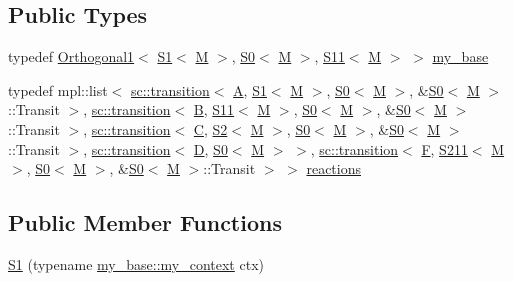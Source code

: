 \subsection*{Public Types}
\begin{DoxyCompactItemize}
\item 
typedef \mbox{\hyperlink{struct_orthogonal1}{Orthogonal1}}$<$ \mbox{\hyperlink{struct_s1}{S1}}$<$ \mbox{\hyperlink{struct_m}{M}} $>$, \mbox{\hyperlink{struct_s0}{S0}}$<$ \mbox{\hyperlink{struct_m}{M}} $>$, \mbox{\hyperlink{struct_s11}{S11}}$<$ \mbox{\hyperlink{struct_m}{M}} $>$ $>$ \mbox{\hyperlink{struct_s1_a61df79a9bb93c0317d33b9602244cdf7}{my\+\_\+base}}
\item 
typedef mpl\+::list$<$ \mbox{\hyperlink{classboost_1_1statechart_1_1transition}{sc\+::transition}}$<$ \mbox{\hyperlink{struct_a}{A}}, \mbox{\hyperlink{struct_s1}{S1}}$<$ \mbox{\hyperlink{struct_m}{M}} $>$, \mbox{\hyperlink{struct_s0}{S0}}$<$ \mbox{\hyperlink{struct_m}{M}} $>$, \&\mbox{\hyperlink{struct_s0}{S0}}$<$ \mbox{\hyperlink{struct_m}{M}} $>$\+::Transit $>$, \mbox{\hyperlink{classboost_1_1statechart_1_1transition}{sc\+::transition}}$<$ \mbox{\hyperlink{struct_b}{B}}, \mbox{\hyperlink{struct_s11}{S11}}$<$ \mbox{\hyperlink{struct_m}{M}} $>$, \mbox{\hyperlink{struct_s0}{S0}}$<$ \mbox{\hyperlink{struct_m}{M}} $>$, \&\mbox{\hyperlink{struct_s0}{S0}}$<$ \mbox{\hyperlink{struct_m}{M}} $>$\+::Transit $>$, \mbox{\hyperlink{classboost_1_1statechart_1_1transition}{sc\+::transition}}$<$ \mbox{\hyperlink{struct_c}{C}}, \mbox{\hyperlink{struct_s2}{S2}}$<$ \mbox{\hyperlink{struct_m}{M}} $>$, \mbox{\hyperlink{struct_s0}{S0}}$<$ \mbox{\hyperlink{struct_m}{M}} $>$, \&\mbox{\hyperlink{struct_s0}{S0}}$<$ \mbox{\hyperlink{struct_m}{M}} $>$\+::Transit $>$, \mbox{\hyperlink{classboost_1_1statechart_1_1transition}{sc\+::transition}}$<$ \mbox{\hyperlink{struct_d}{D}}, \mbox{\hyperlink{struct_s0}{S0}}$<$ \mbox{\hyperlink{struct_m}{M}} $>$ $>$, \mbox{\hyperlink{classboost_1_1statechart_1_1transition}{sc\+::transition}}$<$ \mbox{\hyperlink{struct_f}{F}}, \mbox{\hyperlink{struct_s211}{S211}}$<$ \mbox{\hyperlink{struct_m}{M}} $>$, \mbox{\hyperlink{struct_s0}{S0}}$<$ \mbox{\hyperlink{struct_m}{M}} $>$, \&\mbox{\hyperlink{struct_s0}{S0}}$<$ \mbox{\hyperlink{struct_m}{M}} $>$\+::Transit $>$ $>$ \mbox{\hyperlink{struct_s1_a3da743f3095f20881e0a197c37f7f91f}{reactions}}
\end{DoxyCompactItemize}
\subsection*{Public Member Functions}
\begin{DoxyCompactItemize}
\item 
\mbox{\hyperlink{struct_s1_a399131152a6789765e00223c36791861}{S1}} (typename \mbox{\hyperlink{struct_orthogonal1_a8cee9db1dad468ee5f8e34871d7a4ae2}{my\+\_\+base\+::my\+\_\+context}} ctx)
\end{DoxyCompactItemize}
